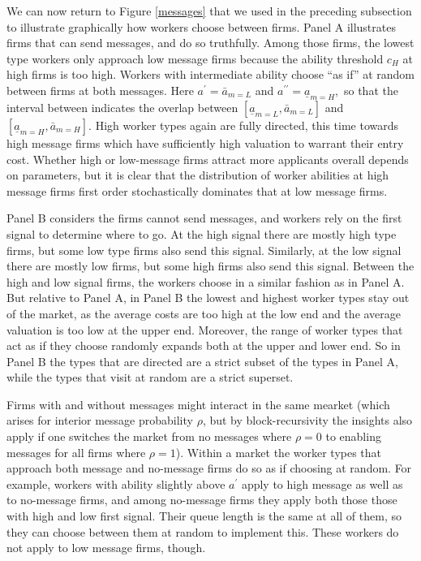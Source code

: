\documentclass[12pt]{article}
\begin{document}
We can now return to Figure \ref{messages} that we used in the preceding subsection to illustrate graphically how workers choose between
firms. Panel A illustrates firms that can send messages, and do so
truthfully. Among those firms, the lowest type workers only approach low
message firms because the ability threshold $c_{H}$ at high firms is too
high. Workers with intermediate ability choose ``as if'' at random between
firms at both messages. Here $a^{\prime }=\bar{a}_{m=L}$ and $a^{\prime
\prime }=\underline{a}_{m=H},$ so that the interval between indicates the
overlap between $[\underline{a}_{m=L},\bar{a}_{m=L}]$ and $[\underline{a}%
_{m=H},\bar{a}_{m=H}]$. High worker types again are fully directed, this
time towards high message firms which have sufficiently high valuation to
warrant their entry cost. Whether high or low-message firms attract more
applicants overall depends on parameters, but it is clear that the
distribution of worker abilities at high message firms first order
stochastically dominates that at low message firms.

Panel B considers the firms cannot send messages, and workers rely
on the first signal to determine where to go. At the high signal there are
mostly high type firms, but some low type firms also send this signal.
Similarly, at the low signal there are mostly low firms, but some high firms
also send this signal. Between the high and low signal firms, the workers
choose in a similar fashion as in Panel A. But relative to Panel A, in Panel
B the lowest and highest worker types stay out of the market, as the average
costs are too high at the low end and the average valuation is too low at
the upper end. Moreover, the range of worker types that act as if they
choose randomly expands both at the upper and lower end. So in Panel B the
types that are directed are a strict subset of the types in Panel A, while
the types that visit at random are a strict superset.

Firms with and without messages might interact in the same mearket (which arises for interior message probability $\rho$, but by block-recursivity the insights also apply if one switches the market from no messages where $\rho=0$ to enabling messages for all firms where $\rho=1$). Within a market the worker types that approach both message and no-message firms do so as if choosing at random. For example, workers with ability slightly above $a^{\prime }$ apply to high
message as well as to no-message firms, and among no-message firms they apply both those those with high and low first signal. Their
queue length is the same at all of them, so they can choose between them at
random to implement this. These workers do not apply to low message firms, though.
\end{document}
